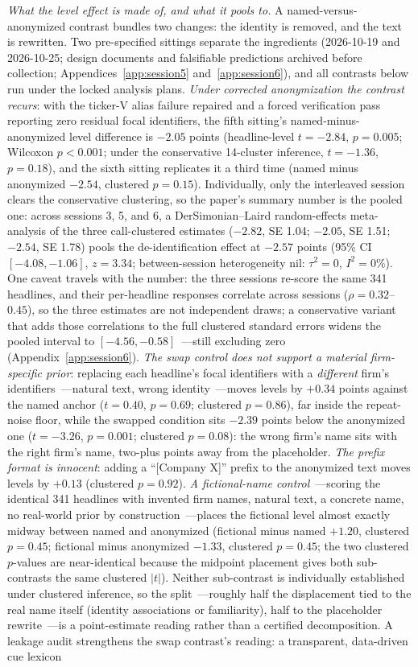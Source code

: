\emph{What the level effect is made of, and what it pools to.} A named-versus-anonymized contrast bundles two changes: the identity is removed, and the text is rewritten. Two pre-specified sittings separate the ingredients (2026-10-19 and 2026-10-25; design documents and falsifiable predictions archived before collection; Appendices~\ref{app:session5} and~\ref{app:session6}), and all contrasts below run under the locked analysis plans. \emph{Under corrected anonymization the contrast recurs}: with the ticker-V alias failure repaired and a forced verification pass reporting zero residual focal identifiers, the fifth sitting's named-minus-anonymized level difference is $-2.05$ points (headline-level $t=-2.84$, $p=0.005$; Wilcoxon $p<0.001$; under the conservative 14-cluster inference, $t=-1.36$, $p=0.18$), and the sixth sitting replicates it a third time (named minus anonymized $-2.54$, clustered $p=0.15$). Individually, only the interleaved session clears the conservative clustering, so the paper's summary number is the pooled one: across sessions 3, 5, and 6, a DerSimonian--Laird random-effects meta-analysis of the three call-clustered estimates ($-2.82$, SE 1.04; $-2.05$, SE 1.51; $-2.54$, SE 1.78) pools the de-identification effect at $-2.57$ points (95\% CI $[-4.08, -1.06]$, $z=3.34$; between-session heterogeneity nil: $\tau^2=0$, $I^2=0\%$). One caveat travels with the number: the three sessions re-score the same 341 headlines, and their per-headline responses correlate across sessions ($\rho=0.32$--$0.45$), so the three estimates are not independent draws; a conservative variant that adds those correlations to the full clustered standard errors widens the pooled interval to $[-4.56, -0.58]$~---still excluding zero (Appendix~\ref{app:session6}). \emph{The swap control does not support a material firm-specific prior}: replacing each headline's focal identifiers with a \emph{different} firm's identifiers~---natural text, wrong identity~---moves levels by $+0.34$ points against the named anchor ($t=0.40$, $p=0.69$; clustered $p=0.86$), far inside the repeat-noise floor, while the swapped condition sits $-2.39$ points below the anonymized one ($t=-3.26$, $p=0.001$; clustered $p=0.08$): the wrong firm's name sits with the right firm's name, two-plus points away from the placeholder. \emph{The prefix format is innocent}: adding a ``[Company X]'' prefix to the anonymized text moves levels by $+0.13$ (clustered $p=0.92$). \emph{A fictional-name control}~---scoring the identical 341 headlines with invented firm names, natural text, a concrete name, no real-world prior by construction~---places the fictional level almost exactly midway between named and anonymized (fictional minus named $+1.20$, clustered $p=0.45$; fictional minus anonymized $-1.33$, clustered $p=0.45$; the two clustered $p$-values are near-identical because the midpoint placement gives both sub-contrasts the same clustered $|t|$). Neither sub-contrast is individually established under clustered inference, so the split~---roughly half the displacement tied to the real name itself (identity associations or familiarity), half to the placeholder rewrite~---is a point-estimate reading rather than a certified decomposition. A leakage audit strengthens the swap contrast's reading: a transparent, data-driven cue lexicon 